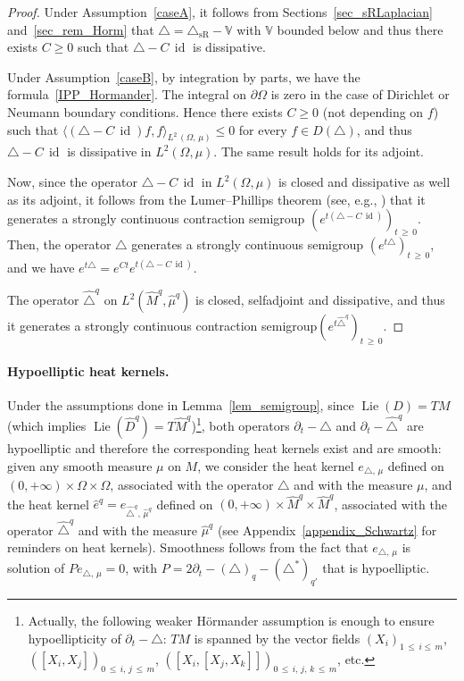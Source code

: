 \documentclass[10pt]{amsart}
\theoremstyle{definition}\newtheorem{defi}[theo]{Definition}\newtheorem{rema}[theo]{Remark}\newtheorem{exam}[theo]{Example}\newtheorem{exem}[theo]{Example}\newtheorem{nota}[theo]{Notation}
\newcommand{\bbV}{\mathbb{V}}
\DeclareMathOperator{\Lie}{Lie}
\DeclareMathOperator{\id}{id}
\newcommand{\trianglesR}{\triangle_{\mathrm{sR}}}
\renewcommand{\geq}{\geqslant}
\renewcommand{\leq}{\leqslant}
\begin{document}
\begin{proof}
Under Assumption~\ref{caseA}, it follows from Sections~\ref{sec_sRLaplacian} and~\ref{sec_rem_Horm} that $\triangle = \trianglesR - \bbV$ with $\bbV$ bounded below and thus there exists $C\geq 0$ such that $\triangle-C\,\id$ is dissipative.

Under Assumption~\ref{caseB}, by integration by parts, we have the formula~\eqref{IPP_Hormander}. The integral on $\partial\Omega$ is zero in the case of Dirichlet or Neumann boundary conditions. Hence there exists $C\geq 0$ (not depending on $f$) such that $\langle(\triangle-C\,\id) f,f\rangle_{L^2\,(\Omega,\,\mu)}\leq 0$ for every $f\in D(\triangle)$, and thus $\triangle-C\,\id$ is dissipative in $L^2(\Omega,\mu)$. The same result holds for its adjoint.

Now, since the operator $\triangle-C\,\id$ in $L^2(\Omega,\mu)$ is closed and dissipative as well as its adjoint, it follows from the Lumer--Phillips theorem (see, e.g., \cite{EngelNagel,Pazy}) that it generates a strongly continuous contraction semigroup $(e^{t(\triangle-C\,\id)})_{t\,\geq\,0}$. Then, the operator $\triangle$ generates a strongly continuous semigroup $(e^{t\triangle})_{t\,\geq\,0}$, and we have $e^{t\triangle} = e^{C t} e^{t(\triangle-C\,\id)}$.

The operator $\widehat{\triangle}^{q}$ on $L^2(\widehat M^{q},\widehat\mu^{q})$ is closed, selfadjoint and dissipative, and thus it generates a strongly continuous contraction semigroup$ (e^{t\widehat{\triangle}^{q}})_{t\,\geq\,0}$.
\end{proof}

\paragraph{Hypoelliptic heat kernels.}
Under the assumptions done in Lemma~\ref{lem_semigroup}, since $\Lie(D)=TM$ (which implies $\Lie(\widehat D^{q})=T\widehat M^{q}$)\footnote{Actually, the following weaker H\"ormander assumption is enough to ensure hypoellipticity of $\partial_t-\triangle$: $TM$ is spanned by the vector fields $(X_i)_{1\,\leq\,i\leq\,m}$, $([X_i,X_j])_{0\,\leq\,i,\,j\,\leq\,m}$, $([X_i,[X_j,X_k]])_{0\,\leq\,i,\,j,\,k\,\leq\,m}$, etc.}, both operators $\partial_t-\triangle$ and $\partial_t-\widehat\triangle^{q}$ are hypoelliptic and therefore the corresponding heat kernels exist and are smooth: given any smooth measure $\mu$ on $M$, we consider the heat kernel $e_{\triangle,\,\mu}$ defined on $(0,+\infty)\times\Omega\times\Omega$, associated with the operator $\triangle$ and with the measure $\mu$, and the heat kernel $\widehat{e}^{q} = e_{\widehat{\triangle}^{q},\,\widehat{\mu}^{q}}$ defined on $(0,+\infty)\times\widehat{M}^{q}\times\widehat{M}^{q}$, associated with the operator $\widehat{\triangle}^{q}$ and with the measure $\widehat{\mu}^{q}$ (see Appendix~\ref{appendix_Schwartz} for reminders on heat kernels). Smoothness follows from the fact that $e_{\triangle,\,\mu}$ is solution of $Pe_{\triangle,\,\mu}=0$, with $P=2\partial_t-(\triangle)_q-(\triangle^*)_{q'}$ that is hypoelliptic.
\end{document}
